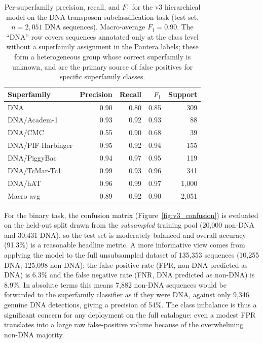 \documentclass[12pt]{article}
\begin{document}
\begin{table}[h]
\centering
\caption{Per-superfamily precision, recall, and $F_1$ for the v3 hierarchical model on the DNA transposon subclassification task (test set, $n=2{,}051$ DNA sequences). Macro-average $F_1 = 0.90$. The ``DNA'' row covers sequences annotated only at the class level without a superfamily assignment in the Pantera labels; these form a heterogeneous group whose correct superfamily is unknown, and are the primary source of false positives for specific superfamily classes.}
\label{tab:v3_sf_f1}
\small
\begin{tabular}{lrrrr}
\toprule
Superfamily & Precision & Recall & $F_1$ & Support \\
\midrule
DNA         & 0.90 & 0.80 & 0.85 & 309 \\
DNA/Academ-1    & 0.93 & 0.92 & 0.93 & 88 \\
DNA/CMC         & 0.55 & 0.90 & 0.68 & 39 \\
DNA/PIF-Harbinger & 0.95 & 0.92 & 0.94 & 155 \\
DNA/PiggyBac    & 0.94 & 0.97 & 0.95 & 119 \\
DNA/TcMar-Tc1  & 0.99 & 0.93 & 0.96 & 341 \\
DNA/hAT         & 0.96 & 0.99 & 0.97 & 1{,}000 \\
\midrule
Macro avg   & 0.89 & 0.92 & 0.90 & 2{,}051 \\
\bottomrule
\end{tabular}
\end{table}

For the binary task, the confusion matrix (Figure~\ref{fig:v3_confusion}) is evaluated on the held-out split drawn from the \emph{subsampled} training pool (20{,}000 non-DNA and 30{,}431 DNA), so the test set is moderately balanced and overall accuracy (91.3\%) is a reasonable headline metric. A more informative view comes from applying the model to the full unsubsampled dataset of 135{,}353 sequences (10{,}255 DNA; 125{,}098 non-DNA): the false positive rate (FPR, non-DNA predicted as DNA) is 6.3\% and the false negative rate (FNR, DNA predicted as non-DNA) is 8.9\%. In absolute terms this means 7{,}882 non-DNA sequences would be forwarded to the superfamily classifier as if they were DNA, against only 9{,}346 genuine DNA detections, giving a precision of 54\%. The class imbalance is thus a significant concern for any deployment on the full catalogue: even a modest FPR translates into a large raw false-positive volume because of the overwhelming non-DNA majority.
\end{document}
